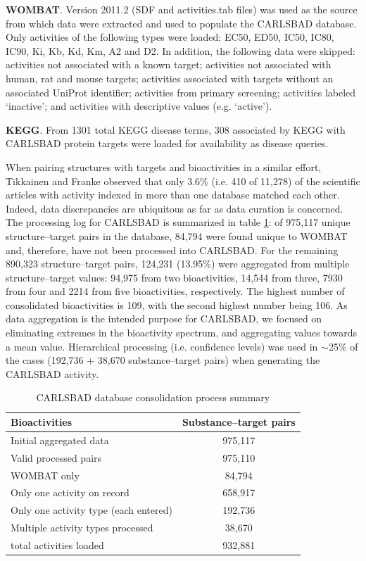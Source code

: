 \textbf{WOMBAT}. Version 2011.2 (SDF and activities.tab files) was used as the source from which data were extracted and used to populate the CARLSBAD database. Only activities of the following types were loaded: EC50, ED50, IC50, IC80, IC90, Ki, Kb, Kd, Km, A2 and D2. In addition, the following data were skipped: activities not associated with a known target; activities not associated with human, rat and mouse targets; activities associated with targets without an associated UniProt identifier; activities from primary screening; activities labeled ‘inactive’; and activities with descriptive values (e.g. ‘active’).

\textbf{KEGG}. From 1301 total KEGG disease terms, 308 associated by KEGG with CARLSBAD protein targets were loaded for availability as disease queries.

When pairing structures with targets and bioactivities in a similar effort, Tikkainen and Franke observed that only 3.6\% (i.e. 410 of 11,278) of the scientific articles with activity indexed in more than one database matched each other. Indeed, data discrepancies are ubiquitous as far as data curation is concerned\cite{Tiikkainen2012-cw}. The processing log for CARLSBAD is summarized in table \ref{tab:cb_01}: of 975,117 unique structure–target pairs in the database, 84,794 were found unique to WOMBAT and, therefore, have not been processed into CARLSBAD. For the remaining 890,323 structure–target pairs, 124,231 (13.95\%) were aggregated from multiple structure–target values: 94,975 from two bioactivities, 14,544 from three, 7930 from four and 2214 from five bioactivities, respectively. The highest number of consolidated bioactivities is 109, with the second highest number being 106. As data aggregation is the intended purpose for CARLSBAD, we focused on eliminating extremes in the bioactivity spectrum, and aggregating values towards a mean value. Hierarchical processing (i.e. confidence levels) was used in $\sim$25\% of the cases (192,736 + 38,670 substance–target pairs) when generating the CARLSBAD activity.

\begin{table}
\caption{CARLSBAD database consolidation process summary}
\label{tab:cb_01}
\centering
\begin{tabular}{l|c}
\hline
\textbf{Bioactivities} & \textbf{Substance–target pairs} \\
\hline
Initial aggregated data & 975,117\\
Valid processed pairs & 975,110\\
WOMBAT only & 84,794\\
Only one activity on record & 658,917\\
Only one activity type (each entered) & 192,736\\ 
Multiple activity types processed & 38,670\\
total activities loaded & 932,881\\
\hline
\end{tabular}
\end{table}

